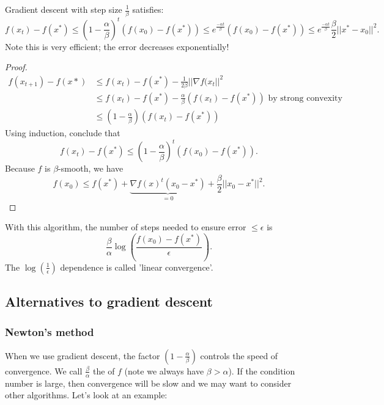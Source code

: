 \documentclass[a4paper]{scrartcl}
\begin{document}
\begin{theorem}
	Gradient descent with step size $\frac{1}{\beta}$ satisfies: 
	\[f(x_t)-f(x^*)\leq (1-\frac{\alpha}{\beta})^t (f(x_0)-f(x^*))\leq e^{\frac{-\alpha t}{\beta}} (f (x_0)- f (x^*))\leq e^{\frac{-\alpha t}{\beta}} \frac{\beta}{2}||x^*-x_0||^2.\]
	Note this is very efficient; the error decreases exponentially!

\end{theorem}
\begin{proof}
	 \begin{equation*}
		  \begin{split}
			  f(x_{t+1})-f (x*)&\leq f (x_t)- f (x^*)-\frac{1}{2\beta}||\nabla f(x_t||^2\\
			  &\leq f(x_t)- f (x^*) - \frac{\alpha}{\beta}(f (x_t)-f (x^*)) \text{ by strong convexity} \\
			  &\leq (1-\frac{\alpha}{\beta}	)(f (x_t)-f (x^*))
		  \end{split}
	 \end{equation*}
	 Using induction, conclude that 
	 \[f (x_t)-f (x^*)\leq (1-\frac{\alpha}{\beta})^t (f (x_0)-f (x^*)).\]
	 Because $f$ is $\beta$-smooth, we have 
	 \[f(x_0)\leq f (x^*)+\underbrace{\nabla f (x)^t (x_0-x^*)}_{=0}+\frac{\beta}{2}||x_0-x^*||^2.\]
\end{proof}
\begin{remark}
	With this algorithm, the number of steps needed to ensure error $\leq \epsilon$ is 
	\[\frac{\beta}{\alpha}\log (\frac{f (x_0)-f (x^*)}{\epsilon} ).\]
	The $\log (\frac{1}{\epsilon })$ dependence is called 'linear convergence'.
	
\end{remark}
\subsection{Alternatives to gradient descent}
\subsubsection{Newton's method}
When we use gradient descent, the factor $(1-\frac{\alpha}{\beta})$ controls the speed of convergence. We call $\frac{\beta}{\alpha}$ the  of $f$ (note we always have $\beta>\alpha$). If the condition number is large, then convergence will be slow and we may want to consider other algorithms. Let's look at an example:
\end{document}
